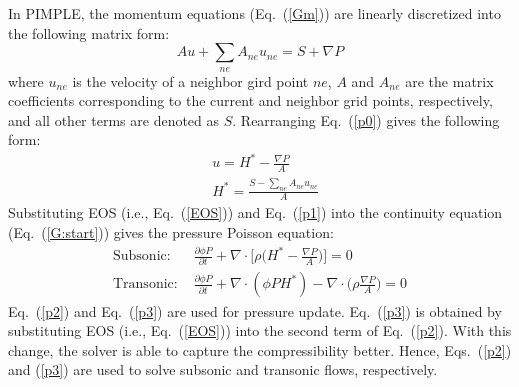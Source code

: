     In PIMPLE, the momentum equations (Eq.~(\ref{Gm})) are linearly discretized into the following matrix form:
    \begin{equation}
        A u+ \sum_{ne} A_{ne} u_{ne} =S+\nabla P \label{p0}
    \end{equation}
    where $u_{ne}$ is the velocity of a neighbor gird point $ne$, $A$ and $A_{ne}$ are the matrix coefficients corresponding to the current and neighbor grid points, respectively, and all other terms are denoted as $S$. Rearranging Eq.~(\ref{p0}) gives the following form:
    \begin{align}
         & u=H^*-\frac{\nabla P}{A}\label{p1}       \\
         & H^* =\frac{S-\sum_{ne} A_{ne} u_{ne}}{A}
    \end{align}
    Substituting EOS (i.e., Eq.~(\ref{EOS})) and Eq.~(\ref{p1}) into the continuity equation (Eq.~(\ref{G:start})) gives the pressure Poisson equation:
    \begin{align}
        \text{Subsonic: }  & \frac{\partial\phi P}{\partial t}+\nabla\cdot \Bigg[\rho \bigg(H^*- \frac{\nabla P}{A}\bigg)\Bigg]=0 \label{p2}         \\
        \text{Transonic: } & \frac{\partial\phi P}{\partial t}+\nabla\cdot (\phi P H^*)-\nabla\cdot \bigg(\rho \frac{\nabla P}{A}\bigg)=0 \label{p3}
    \end{align}
    Eq.~(\ref{p2}) and Eq.~(\ref{p3}) are used for pressure update. Eq.~(\ref{p3}) is obtained by substituting EOS (i.e., Eq.~(\ref{EOS})) into the second term of Eq.~(\ref{p2}). With this change, the solver is able to capture the compressibility better. Hence, Eqs.~(\ref{p2}) and (\ref{p3}) are used to solve subsonic and transonic flows, respectively.

